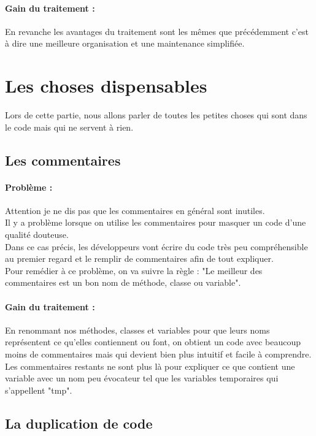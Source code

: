 \documentclass[a4paper,twoside,12pt,openright]{report}
\begin{document}
\paragraph{Gain du traitement :}
En revanche les avantages du traitement sont les mêmes que précédemment c'est à dire une meilleure organisation et une maintenance simplifiée.\\

\newpage

\section{Les choses dispensables}
Lors de cette partie, nous allons parler de toutes les petites choses qui sont dans le code mais qui ne servent à rien.

\subsection{Les commentaires}
\paragraph{Problème :}
Attention je ne dis pas que les commentaires en général sont inutiles.\\
Il y a problème lorsque on utilise les commentaires pour masquer un code d'une qualité douteuse.\\
Dans ce cas précis, les développeurs vont écrire du code très peu compréhensible au premier regard et le remplir de commentaires afin de tout expliquer.\\
Pour remédier à ce problème, on va suivre la règle : "Le meilleur des commentaires est un bon nom de méthode, classe ou variable".\\

\paragraph{Gain du traitement :}
En renommant nos méthodes, classes et variables pour que leurs noms représentent ce qu'elles contiennent ou font, on obtient un code avec beaucoup moins de commentaires mais qui devient bien plus intuitif et facile à comprendre.\\
Les commentaires restants ne sont plus là pour expliquer ce que contient une variable avec un nom peu évocateur tel que les variables temporaires qui s'appellent "tmp".\\

\subsection{La duplication de code}
\end{document}
